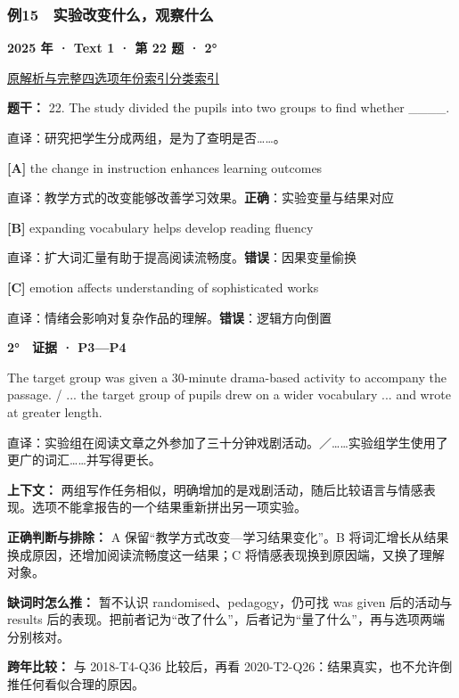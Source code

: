 \documentclass[11pt,a4paper]{article}
\begin{document}
\subsubsection{例15　实验改变什么，观察什么}\label{case-2025-T1-Q22}
\noindent\textbf{2025 年 · Text 1 · 第 22 题 · 2°}\par\noindent \href{https://zj139.github.io/math-notes/english/cabb22521ad878901633c3a3/\#q22}{原解析与完整四选项}\quad \hyperref[idx-2025-T1-Q22]{年份索引}\quad \hyperref[class-R07]{分类索引}\par\smallskip
\noindent\textbf{题干：} 22. The study divided the pupils into two groups to find whether \_\_\_\_.\par\smallskip
直译：研究把学生分成两组，是为了查明是否……。

\noindent\textbf{[A]} the change in instruction enhances learning outcomes\par\nopagebreak
\noindent 直译：教学方式的改变能够改善学习效果。\quad\textbf{正确}：实验变量与结果对应\par\smallskip
{}\noindent\textbf{[B]} expanding vocabulary helps develop reading fluency\par\nopagebreak
\noindent 直译：扩大词汇量有助于提高阅读流畅度。\quad\textbf{错误}：因果变量偷换\par\smallskip
{}\noindent\textbf{[C]} emotion affects understanding of sophisticated works\par\nopagebreak
\noindent 直译：情绪会影响对复杂作品的理解。\quad\textbf{错误}：逻辑方向倒置\par\smallskip
\begin{evidence}\textbf{2°　证据 · P3—P4}\par The target group was given a 30-minute drama-based activity to accompany the passage. / ... the target group of pupils drew on a wider vocabulary ... and wrote at greater length.\par 直译：实验组在阅读文章之外参加了三十分钟戏剧活动。／……实验组学生使用了更广的词汇……并写得更长。\end{evidence}
\noindent\textbf{上下文：} 两组写作任务相似，明确增加的是戏剧活动，随后比较语言与情感表现。选项不能拿报告的一个结果重新拼出另一项实验。\par\smallskip
\noindent\textbf{正确判断与排除：} A 保留“教学方式改变—学习结果变化”。B 将词汇增长从结果换成原因，还增加阅读流畅度这一结果；C 将情感表现换到原因端，又换了理解对象。\par\smallskip
\noindent\textbf{缺词时怎么推：} 暂不认识 randomised、pedagogy，仍可找 was given 后的活动与 results 后的表现。把前者记为“改了什么”，后者记为“量了什么”，再与选项两端分别核对。\par\smallskip
\noindent\textbf{跨年比较：} 与 2018-T4-Q36 比较后，再看 2020-T2-Q26：结果真实，也不允许倒推任何看似合理的原因。\par\smallskip
\clearpage
\end{document}
